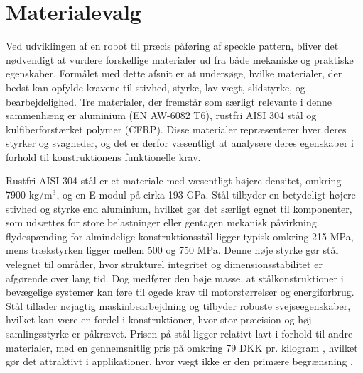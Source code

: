 \section{Materialevalg} \label{Materialevalg}

Ved udviklingen af en robot til præcis påføring af speckle pattern, bliver det nødvendigt at vurdere forskellige materialer ud fra både mekaniske og praktiske egenskaber. Formålet med dette afsnit er at undersøge, hvilke materialer, der bedst kan opfylde kravene til stivhed, styrke, lav vægt, slidstyrke, og bearbejdelighed. Tre materialer, der fremstår som særligt relevante i denne sammenhæng er aluminium (EN AW-6082 T6), rustfri AISI 304 stål og kulfiberforstærket polymer (CFRP). Disse materialer repræsenterer hver deres styrker og svagheder, og det er derfor væsentligt at analysere deres egenskaber i forhold til konstruktionens funktionelle krav.


Rustfri AISI 304 stål er et materiale med væsentligt højere densitet, omkring 7900 kg/m\(^3\), og en E-modul på cirka 193 GPa. Stål tilbyder en betydeligt højere stivhed og styrke end aluminium, hvilket gør det særligt egnet til komponenter, som udsættes for store belastninger eller gentagen mekanisk påvirkning. flydespænding for almindelige konstruktionsstål ligger typisk omkring 215 MPa, mens trækstyrken ligger mellem 500 og 750 MPa. Denne høje styrke gør stål velegnet til områder, hvor strukturel integritet og dimensionsstabilitet er afgørende over lang tid. Dog medfører den høje masse, at stålkonstruktioner i bevægelige systemer kan føre til øgede krav til motorstørrelser og energiforbrug. Stål tillader nøjagtig maskinbearbejdning og tilbyder robuste svejseegenskaber, hvilket kan være en fordel i konstruktioner, hvor stor præcision og høj samlingsstyrke er påkrævet. Prisen på stål ligger relativt lavt i forhold til andre materialer, med en gennemsnitlig pris på omkring 79 DKK pr. kilogram \parencite{Stalprofil}, hvilket gør det attraktivt i applikationer, hvor vægt ikke er den primære begrænsning \parencite{Jessen2011RustfritKorrosion}.

